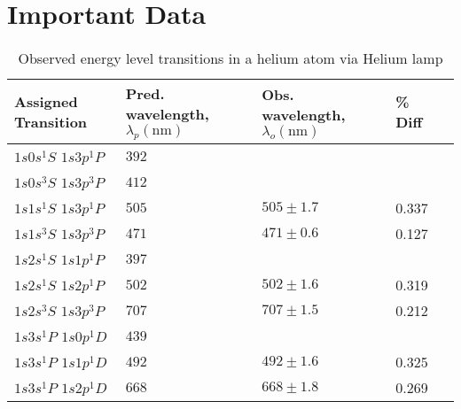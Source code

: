 \documentclass[10pt, twocolumn]{article}
\theoremstyle{definition}
\begin{document}
\section{Important Data}
\begin{table}[h]
    \centering%
    \caption{Observed energy level transitions in a helium atom via Helium lamp}
    \begin{tabular}{p{}p{}p{}p{}p{}}
        \toprule
        Assigned Transition         & Pred. wavelength, $\lambda_p (\unit{\nano\meter})$ & Obs. wavelength, $\lambda_o (\unit{\nano\meter})$ & \% Diff \\
        \midrule
        $1s0s{}^1\!S$ $1s3p{}^1\!P$ & $392$                                              &                                                   &         \\
        \hline
        $1s0s{}^3\!S$ $1s3p{}^3\!P$ & $412$                                              &                                                   &         \\
        \hline
        $1s1s{}^1\!S$ $1s3p{}^1\!P$ & $505$                                              & $505\pm1.7$                                       & 0.337   \\
        \hline
        $1s1s{}^3\!S$ $1s3p{}^3\!P$ & $471$                                              & $471\pm0.6$                                       & 0.127   \\
        \hline
        $1s2s{}^1\!S$ $1s1p{}^1\!P$ & $397$                                              &                                                   &         \\
        \hline
        $1s2s{}^1\!S$ $1s2p{}^1\!P$ & $502$                                              & $502\pm1.6$                                       & 0.319   \\
        \hline
        $1s2s{}^3\!S$ $1s3p{}^3\!P$ & $707$                                              & $707\pm1.5$                                       & 0.212   \\
        \hline
        $1s3s{}^1\!P$ $1s0p{}^1\!D$ & $439$                                              &                                                   &         \\
        \hline
        $1s3s{}^1\!P$ $1s1p{}^1\!D$ & $492$                                              & $492\pm1.6$                                       & 0.325   \\
        \hline
        $1s3s{}^1\!P$ $1s2p{}^1\!D$ & $668$                                              & $668\pm1.8$                                       & 0.269   \\
        \bottomrule
    \end{tabular}
    \label{he-res-table}
\end{table}
\end{document}
